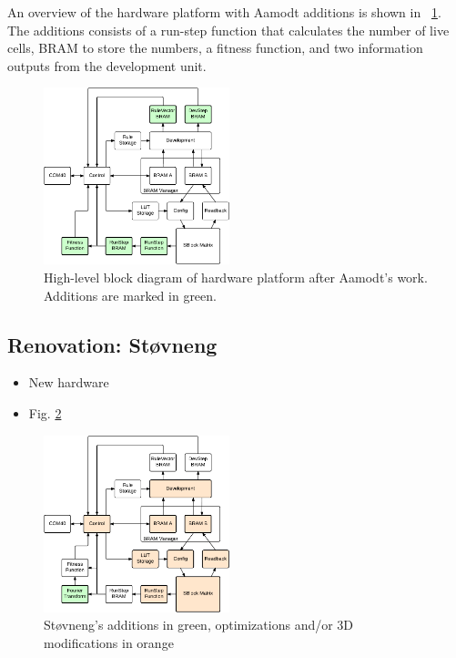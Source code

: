 An overview of the hardware platform with Aamodt additions is shown in \figurename~\ref{fig:overview-aamodt}.
The additions consists of a run-step function that calculates the number of live cells, BRAM to store the numbers, a fitness function, and two information outputs from the development unit.

\begin{figure}[!ht]
    \centering
    \includegraphics[width=0.48\textwidth]{figures/overview-aamodt}
    \caption{High-level block diagram of hardware platform after Aamodt's work. Additions are marked in green.}
    \label{fig:overview-aamodt}
\end{figure}



\subsection{Renovation: Støvneng \cite{stovneng2014sblock}}

\begin{itemize}
    \item New hardware
    \item Fig. \ref{fig:overview-stovneng}
\end{itemize}

\begin{figure}[!ht]
    \centering
    \includegraphics[width=0.48\textwidth]{figures/overview-stovneng}
    \caption{Støvneng's additions in green, optimizations and/or 3D modifications in orange}
    \label{fig:overview-stovneng}
\end{figure}

